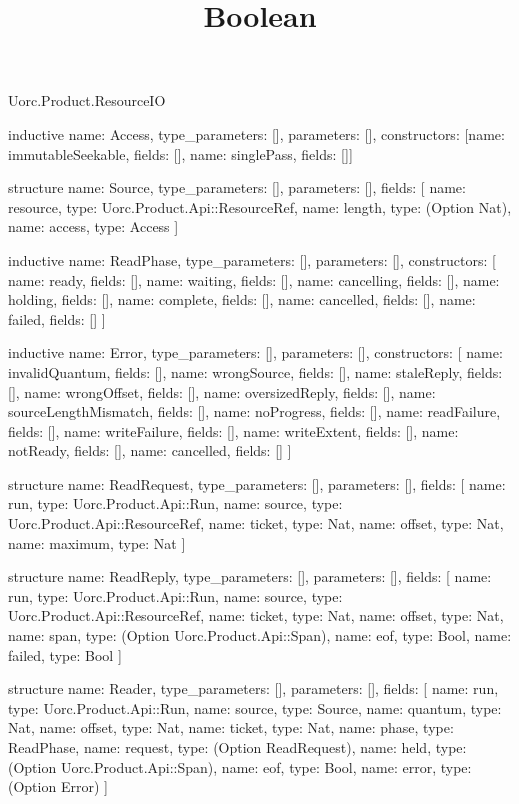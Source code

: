 \begin{lexlean}{Uorc.Product.ResourceIO}
\title{Boolean}
\begin{semanticmodule}
inductive{
  name: Access,
  type_parameters: [],
  parameters: [],
  constructors: [{name: immutableSeekable, fields: []}, {name: singlePass, fields: []}]
}

structure{
  name: Source,
  type_parameters: [],
  parameters: [],
  fields: [
    {name: resource, type: Uorc.Product.Api::ResourceRef},
    {name: length, type: (Option Nat)},
    {name: access, type: Access}
  ]
}

inductive{
  name: ReadPhase,
  type_parameters: [],
  parameters: [],
  constructors: [
    {name: ready, fields: []},
    {name: waiting, fields: []},
    {name: cancelling, fields: []},
    {name: holding, fields: []},
    {name: complete, fields: []},
    {name: cancelled, fields: []},
    {name: failed, fields: []}
  ]
}

inductive{
  name: Error,
  type_parameters: [],
  parameters: [],
  constructors: [
    {name: invalidQuantum, fields: []},
    {name: wrongSource, fields: []},
    {name: staleReply, fields: []},
    {name: wrongOffset, fields: []},
    {name: oversizedReply, fields: []},
    {name: sourceLengthMismatch, fields: []},
    {name: noProgress, fields: []},
    {name: readFailure, fields: []},
    {name: writeFailure, fields: []},
    {name: writeExtent, fields: []},
    {name: notReady, fields: []},
    {name: cancelled, fields: []}
  ]
}

structure{
  name: ReadRequest,
  type_parameters: [],
  parameters: [],
  fields: [
    {name: run, type: Uorc.Product.Api::Run},
    {name: source, type: Uorc.Product.Api::ResourceRef},
    {name: ticket, type: Nat},
    {name: offset, type: Nat},
    {name: maximum, type: Nat}
  ]
}

structure{
  name: ReadReply,
  type_parameters: [],
  parameters: [],
  fields: [
    {name: run, type: Uorc.Product.Api::Run},
    {name: source, type: Uorc.Product.Api::ResourceRef},
    {name: ticket, type: Nat},
    {name: offset, type: Nat},
    {name: span, type: (Option Uorc.Product.Api::Span)},
    {name: eof, type: Bool},
    {name: failed, type: Bool}
  ]
}

structure{
  name: Reader,
  type_parameters: [],
  parameters: [],
  fields: [
    {name: run, type: Uorc.Product.Api::Run},
    {name: source, type: Source},
    {name: quantum, type: Nat},
    {name: offset, type: Nat},
    {name: ticket, type: Nat},
    {name: phase, type: ReadPhase},
    {name: request, type: (Option ReadRequest)},
    {name: held, type: (Option Uorc.Product.Api::Span)},
    {name: eof, type: Bool},
    {name: error, type: (Option Error)}
  ]
}


\end{semanticmodule}
\end{lexlean}
